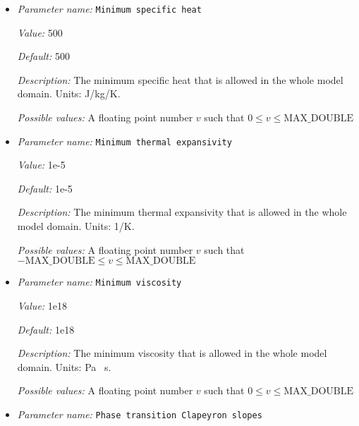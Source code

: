 \begin{itemize}
{\it Default:} 1e-5


{\it Description:} The minimum grain size that is used for the material model. This parameter is introduced to limit local viscosity contrasts, but still allows for a widely varying viscosity over the whole mantle range. Units: m.


{\it Possible values:} A floating point number $v$ such that $0 \leq v \leq \text{MAX\_DOUBLE}$
\item {\it Parameter name:} {\tt Minimum specific heat}
\label{parameters:Material model/Grain size model/Minimum specific heat}


{\it Value:} 500


{\it Default:} 500


{\it Description:} The minimum specific heat that is allowed in the whole model domain. Units: J/kg/K.


{\it Possible values:} A floating point number $v$ such that $0 \leq v \leq \text{MAX\_DOUBLE}$
\item {\it Parameter name:} {\tt Minimum thermal expansivity}
\label{parameters:Material model/Grain size model/Minimum thermal expansivity}


{\it Value:} 1e-5


{\it Default:} 1e-5


{\it Description:} The minimum thermal expansivity that is allowed in the whole model domain. Units: 1/K.


{\it Possible values:} A floating point number $v$ such that $-\text{MAX\_DOUBLE} \leq v \leq \text{MAX\_DOUBLE}$
\item {\it Parameter name:} {\tt Minimum viscosity}
\label{parameters:Material model/Grain size model/Minimum viscosity}


{\it Value:} 1e18


{\it Default:} 1e18


{\it Description:} The minimum viscosity that is allowed in the whole model domain. Units: Pa \, s.


{\it Possible values:} A floating point number $v$ such that $0 \leq v \leq \text{MAX\_DOUBLE}$
\item {\it Parameter name:} {\tt Phase transition Clapeyron slopes}
\label{parameters:Material model/Grain size model/Phase transition Clapeyron slopes}



\end{itemize}
